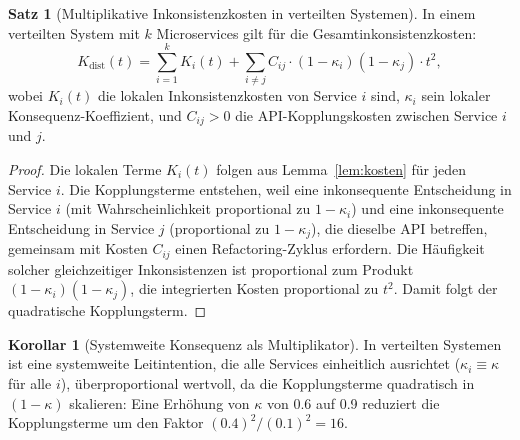 ﻿\documentclass[a4paper,12pt]{article}
\theoremstyle{definition}
\newtheorem{satz}{Satz}
\newtheorem{korollar}{Korollar}
\begin{document}
\begin{satz}[Multiplikative Inkonsistenzkosten in verteilten Systemen]
\label{satz:distributed}
In einem verteilten System mit $k$ Microservices gilt für die
Gesamtinkonsistenzkosten:
\[
K_{\text{dist}}(t) = \sum_{i=1}^k K_i(t) +
\sum_{i \neq j} C_{ij} \cdot (1 - \kappa_i)(1 - \kappa_j) \cdot t^2,
\]
wobei $K_i(t)$ die lokalen Inkonsistenzkosten von Service $i$ sind,
$\kappa_i$ sein lokaler Konsequenz-Koeffizient, und $C_{ij} > 0$
die API-Kopplungskosten zwischen Service $i$ und $j$.
\end{satz}

\begin{proof}
Die lokalen Terme $K_i(t)$ folgen aus Lemma~\ref{lem:kosten} für
jeden Service $i$. Die Kopplungsterme entstehen, weil eine inkonsequente
Entscheidung in Service $i$ (mit Wahrscheinlichkeit proportional zu
$1-\kappa_i$) und eine inkonsequente Entscheidung in Service $j$
(proportional zu $1-\kappa_j$), die dieselbe API betreffen, gemeinsam
mit Kosten $C_{ij}$ einen Refactoring-Zyklus erfordern. Die Häufigkeit
solcher gleichzeitiger Inkonsistenzen ist proportional zum Produkt
$(1-\kappa_i)(1-\kappa_j)$, die integrierten Kosten proportional zu
$t^2$. Damit folgt der quadratische Kopplungsterm.
\end{proof}

\begin{korollar}[Systemweite Konsequenz als Multiplikator]
In verteilten Systemen ist eine systemweite Leitintention, die alle
Services einheitlich ausrichtet ($\kappa_i \equiv \kappa$ für alle $i$),
überproportional wertvoll, da die Kopplungsterme quadratisch in $(1-\kappa)$
skalieren: Eine Erhöhung von $\kappa$ von 0.6 auf 0.9 reduziert die
Kopplungsterme um den Faktor $(0.4)^2/(0.1)^2 = 16$.
\end{korollar}
\end{document}
